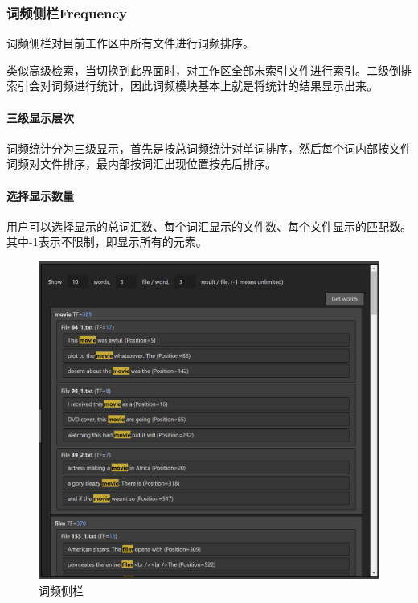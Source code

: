 \documentclass[scheme = chinese]{ctexart}
\begin{document}
\clearpage

\subsubsection{词频侧栏Frequency}
词频侧栏对目前工作区中所有文件进行词频排序。

类似高级检索，当切换到此界面时，对工作区全部未索引文件进行索引。二级倒排索引会对词频进行统计，因此词频模块基本上就是将统计的结果显示出来。

\paragraph{三级显示层次}
词频统计分为三级显示，首先是按总词频统计对单词排序，然后每个词内部按文件词频对文件排序，最内部按词汇出现位置按先后排序。

\paragraph{选择显示数量}
用户可以选择显示的总词汇数、每个词汇显示的文件数、每个文件显示的匹配数。其中-1表示不限制，即显示所有的元素。


\begin{figure}[h]
    \centering
    \includegraphics[width=\textwidth]{images/Frequency.png}
    \caption{词频侧栏}
\end{figure}

\clearpage
\end{document}
